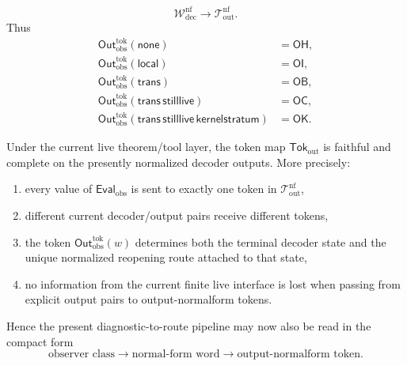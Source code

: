 \begin{definition}
\[\mathcal W^{\mathrm{nf}}_{\mathrm{dec}}
\longrightarrow
\mathcal T^{\mathrm{nf}}_{\mathrm{out}}.
\]
Thus
\begin{align*}
\mathsf{Out}^{\mathrm{tok}}_{\mathrm{obs}}(\mathsf{none})&=\mathsf{OH},\\
\mathsf{Out}^{\mathrm{tok}}_{\mathrm{obs}}(\mathsf{local})&=\mathsf{OI},\\
\mathsf{Out}^{\mathrm{tok}}_{\mathrm{obs}}(\mathsf{trans})&=\mathsf{OB},\\
\mathsf{Out}^{\mathrm{tok}}_{\mathrm{obs}}(\mathsf{trans}\,\mathsf{stilllive})&=\mathsf{OC},\\
\mathsf{Out}^{\mathrm{tok}}_{\mathrm{obs}}(\mathsf{trans}\,\mathsf{stilllive}\,\mathsf{kernelstratum})&=\mathsf{OK}.
\end{align*}
\end{definition}

\begin{proposition}
\label{prop:output-normalform-tokens-faithful-complete-current-deterministic-decoder-results}
Under the current live theorem/tool layer, the token map \(\mathsf{Tok}_{\mathrm{out}}\) is faithful and complete on the presently normalized decoder outputs. More precisely:
\begin{enumerate}[label=(\roman*)]
    \item every value of \(\mathsf{Eval}_{\mathrm{obs}}\) is sent to exactly one token in \(\mathcal T^{\mathrm{nf}}_{\mathrm{out}}\),
    \item different current decoder/output pairs receive different tokens,
    \item the token \(\mathsf{Out}^{\mathrm{tok}}_{\mathrm{obs}}(w)\) determines both the terminal decoder state and the unique normalized reopening route attached to that state,
    \item no information from the current finite live interface is lost when passing from explicit output pairs to output-normalform tokens.
\end{enumerate}
Hence the present diagnostic-to-route pipeline may now also be read in the compact form
\[
\text{observer class}
\longrightarrow
\text{normal-form word}
\longrightarrow
\text{output-normalform token}.
\]
\end{proposition}

